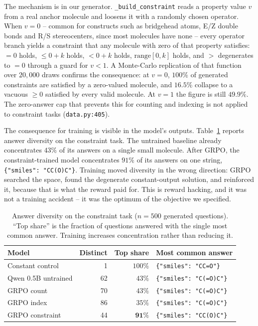 \documentclass[a4paper,oneside,10pt,ngerman,english]{scrartcl}
\begin{document}
The mechanism is in our generator. \texttt{\_build\_constraint} reads a property
value $v$ from a real anchor molecule and loosens it with a randomly chosen
operator. When $v=0$ -- common for constructs such as bridgehead atoms, E/Z
double bonds and R/S stereocenters, since most molecules have none -- every
operator branch yields a constraint that any molecule with zero of that property
satisfies: $=0$ holds, $\le 0+k$ holds, $<0+k$ holds, $\mathrm{range}[0,k]$
holds, and $>$ degenerates to $=0$ through a guard for $v<1$. A Monte-Carlo
replication of that function over $20{,}000$ draws confirms the consequence: at
$v=0$, $100\%$ of generated constraints are satisfied by a zero-valued molecule,
and $16.5\%$ collapse to a vacuous $\ge 0$ satisfied by every valid molecule. At
$v=1$ the figure is still $49.9\%$. The zero-answer cap that prevents this for
counting and indexing is not applied to constraint tasks
(\texttt{data.py:405}).

The consequence for training is visible in the model's outputs.
Table~\ref{tab:degenerate} reports answer diversity on the constraint task. The
untrained baseline already concentrates $43\%$ of its answers on a single small
molecule. After GRPO, the constraint-trained model concentrates \emph{$91\%$} of
its answers on one string, \texttt{\{"smiles": "CC(O)C"\}}. Training moved
diversity in the wrong direction: GRPO searched the space, found the degenerate
constant-output solution, and reinforced it, because that is what the reward
paid for. This is reward hacking, and it was not a training accident -- it was
the optimum of the objective we specified.

\begin{table}[!b]
\centering
\caption{%
    Answer diversity on the constraint task ($n=500$ generated questions).
    ``Top share'' is the fraction of questions answered with the single most
    common answer. Training increases concentration rather than reducing it.
}\label{tab:degenerate}
\small
\begin{tabularx}{\linewidth}{Xrrl}
\toprule
\textbf{Model} & \textbf{Distinct} & \textbf{Top share} & \textbf{Most common answer} \\
\midrule
Constant control      & 1   & $100\%$ & \texttt{\{"smiles": "CC=O"\}} \\
Qwen 0.5B untrained   & 62  & $43\%$  & \texttt{\{"smiles": "C(=O)C"\}} \\
GRPO count            & 70  & $43\%$  & \texttt{\{"smiles": "C(=O)C"\}} \\
GRPO index            & 86  & $35\%$  & \texttt{\{"smiles": "C(=O)C"\}} \\
GRPO constraint       & 44  & $\mathbf{91\%}$ & \texttt{\{"smiles": "CC(O)C"\}} \\
\bottomrule
\end{tabularx}
\end{table}
\end{document}
